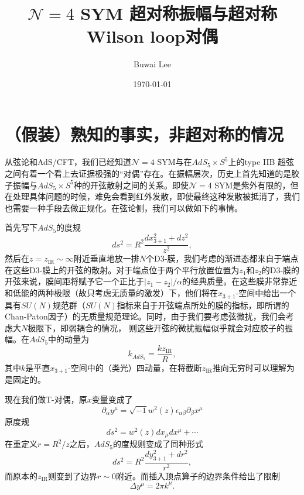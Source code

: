 \documentclass[10pt]{article}
\title{$\mathcal N=4$ SYM 超对称振幅与超对称Wilson loop对偶}
\author{Buwai Lee}
\date{\today}
\begin{document}
\maketitle %

\section{（假装）熟知的事实，非超对称的情况}

从弦论和AdS/CFT，我们已经知道$\mathcal N=4$ SYM与在$AdS_5\times S^5$上的type IIB 超弦之间有着一个看上去证据极强的“对偶”存在。在振幅层次，历史上首先知道的是胶子振幅与$AdS_5\times S^5$种的开弦散射之间的关系。即使$\mathcal N=4$ SYM是紫外有限的，但在处理具体问题的时候，难免会看到红外发散，即使最终这种发散被抵消了，我们也需要一种手段去做正规化。在弦论侧，我们可以做如下的事情。

首先写下$AdS_5$的度规
\[
    ds^2=R^2\frac{dx_{3+1}^2+dz^2}{z^2},
\]
然后在$z=z_{\text{IR}}\sim \infty$附近垂直地放一排$N$个D3-膜，我们考虑的渐进态都来自于端点在这些D3-膜上的开弦的散射。对于端点位于两个平行放置位置为$z_1$和$z_2$的D3-膜的开弦来说，膜间距将赋予它一个正比于$|z_1-z_2|/\alpha$的经典质量。在这些膜非常靠近和低能的两种极限（故只考虑无质量的激发）下，他们将在$x_{3+1}$-空间中给出一个具有$SU(N)$规范群（$SU(N)$指标来自于开弦端点所处的膜的指标，即所谓的Chan-Paton因子）的无质量规范理论。同时，由于我们要考虑弦微扰，我们会考虑大$N$极限下，即弱耦合的情况，
则这些开弦的微扰振幅似乎就会对应胶子的振幅。在$AdS_5$中的动量为
\[
    k_{AdS_5}=\frac{k z_{\text{IR}}}{R},
\]
其中$k$是平直$x_{3+1}$-空间中的（类光）四动量，在将截断$z_{\text{IR}}$推向无穷时可以理解为是固定的。

现在我们做T-对偶，原$x$变量变成了
\[
	\partial_\alpha y^\mu = \sqrt{-1}w^2(z)\epsilon_{\alpha\beta}\partial_\beta x^\mu
\]
原度规
\[
	ds^2=w^2(z)dx_\mu dx^\mu+\cdots
\]
在重定义$r=R^2/z$之后，$AdS_5$的度规则变成了同种形式
\[
	ds^2=R^2\frac{dy^2_{3+1}+dr^2}{r^2},
\]
而原本的$z_{\text{IR}}$则变到了边界$r\sim 0$附近。而插入顶点算子的边界条件给出了限制
\[
	\Delta y^\mu=2\pi k^\mu.
\]
\end{document}
